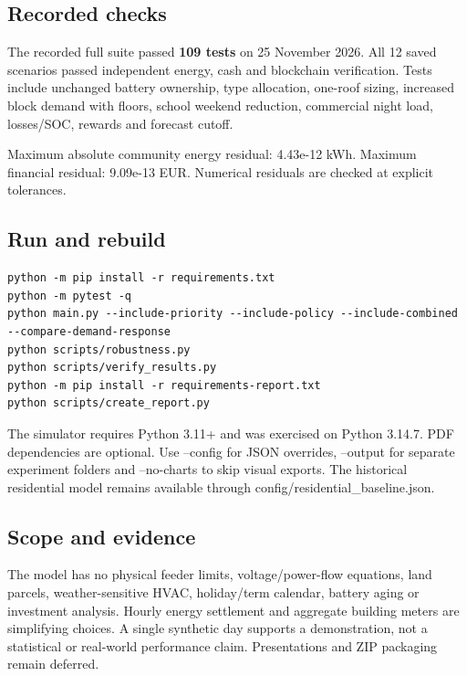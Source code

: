 \documentclass[a4paper,11pt]{article}
\begin{document}
\subsection*{Recorded checks}
\par\medskip

The recorded full suite passed \textbf{109 tests} on 25 November 2026. All 12 saved scenarios passed independent energy, cash and blockchain verification. Tests include unchanged battery ownership, type allocation, one-roof sizing, increased block demand with floors, school weekend reduction, commercial night load, losses/SOC, rewards and forecast cutoff.
\par\medskip

Maximum absolute community energy residual: 4.43e-12 kWh. Maximum financial residual: 9.09e-13 EUR. Numerical residuals are checked at explicit tolerances.
\par\medskip

\subsection*{Run and rebuild}
\par\medskip

\begin{lstlisting}
python -m pip install -r requirements.txt
python -m pytest -q
python main.py --include-priority --include-policy --include-combined --compare-demand-response
python scripts/robustness.py
python scripts/verify_results.py
python -m pip install -r requirements-report.txt
python scripts/create_report.py
\end{lstlisting}

The simulator requires Python 3.11+ and was exercised on Python 3.14.7. PDF dependencies are optional. Use --config for JSON overrides, --output for separate experiment folders and --no-charts to skip visual exports. The historical residential model remains available through config/residential\_baseline.json.
\par\medskip

\subsection*{Scope and evidence}
\par\medskip

The model has no physical feeder limits, voltage/power-flow equations, land parcels, weather-sensitive HVAC, holiday/term calendar, battery aging or investment analysis. Hourly energy settlement and aggregate building meters are simplifying choices. A single synthetic day supports a demonstration, not a statistical or real-world performance claim. Presentations and ZIP packaging remain deferred.
\par\medskip
\end{document}
